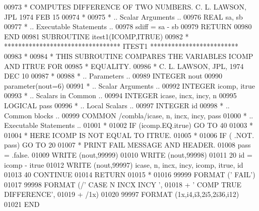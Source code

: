 \begin{DoxyCode}
00973 \textcolor{comment}{*     COMPUTES DIFFERENCE OF TWO NUMBERS.  C. L. LAWSON, JPL 1974 FEB 15}
00974 \textcolor{comment}{*}
00975 \textcolor{comment}{*     .. Scalar Arguments ..}
00976       \textcolor{keywordtype}{REAL}                            sa, sb
00977 \textcolor{comment}{*     .. Executable Statements ..}
00978       sdiff = sa - sb
00979       \textcolor{keywordflow}{RETURN}
00980 \textcolor{keyword}{      END}
00981 \textcolor{keyword}{      SUBROUTINE }itest1(ICOMP,ITRUE)
00982 \textcolor{comment}{*     ********************************* ITEST1 *************************}
00983 \textcolor{comment}{*}
00984 \textcolor{comment}{*     THIS SUBROUTINE COMPARES THE VARIABLES ICOMP AND ITRUE FOR}
00985 \textcolor{comment}{*     EQUALITY.}
00986 \textcolor{comment}{*     C. L. LAWSON, JPL, 1974 DEC 10}
00987 \textcolor{comment}{*}
00988 \textcolor{comment}{*     .. Parameters ..}
00989       \textcolor{keywordtype}{INTEGER}           nout
00990       parameter(nout=6)
00991 \textcolor{comment}{*     .. Scalar Arguments ..}
00992       \textcolor{keywordtype}{INTEGER}           icomp, itrue
00993 \textcolor{comment}{*     .. Scalars in Common ..}
00994       \textcolor{keywordtype}{INTEGER}           icase, incx, incy, n
00995       \textcolor{keywordtype}{LOGICAL}           pass
00996 \textcolor{comment}{*     .. Local Scalars ..}
00997       \textcolor{keywordtype}{INTEGER}           id
00998 \textcolor{comment}{*     .. Common blocks ..}
00999       \textcolor{keyword}{COMMON}            /combla/icase, n, incx, incy, pass
01000 \textcolor{comment}{*     .. Executable Statements ..}
01001 \textcolor{comment}{*}
01002       \textcolor{keywordflow}{IF} (icomp.EQ.itrue) \textcolor{keywordflow}{GO TO} 40
01003 \textcolor{comment}{*}
01004 \textcolor{comment}{*                            HERE ICOMP IS NOT EQUAL TO ITRUE.}
01005 \textcolor{comment}{*}
01006       \textcolor{keywordflow}{IF} ( .NOT. pass) \textcolor{keywordflow}{GO TO} 20
01007 \textcolor{comment}{*                             PRINT FAIL MESSAGE AND HEADER.}
01008       pass = .false.
01009       \textcolor{keyword}{WRITE} (nout,99999)
01010       \textcolor{keyword}{WRITE} (nout,99998)
01011    20 id = icomp - itrue
01012       \textcolor{keyword}{WRITE} (nout,99997) icase, n, incx, incy, icomp, itrue, id
01013    40 \textcolor{keywordflow}{CONTINUE}
01014       \textcolor{keywordflow}{RETURN}
01015 \textcolor{comment}{*}
01016 99999 \textcolor{keyword}{FORMAT} (\textcolor{stringliteral}{'                                       FAIL'})
01017 99998 \textcolor{keyword}{FORMAT} (/\textcolor{stringliteral}{' CASE  N INCX INCY                               '},
01018      +       \textcolor{stringliteral}{' COMP                                TRUE     DIFFERENCE'},
01019      +       /1x)
01020 99997 \textcolor{keyword}{FORMAT} (1x,i4,i3,2i5,2i36,i12)
01021 \textcolor{keyword}{      END}
\end{DoxyCode}
